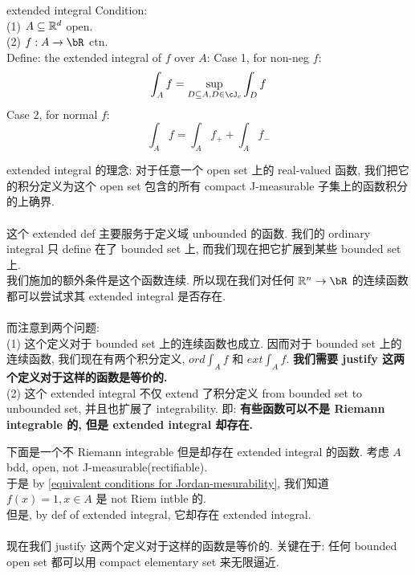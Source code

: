 \begin{definition}{extended integral}
    Condition:\\
    (1) $A \subseteq \mathbb{R}^d$ open.\\
    (2) $f:A\rar \bR $ ctn.\\
    Define: the extended integral of $f$ over $A$:
    Case 1, for non-neg $f$:
    $$
    \int_A f = \sup_{D \sub A, D\in \cJ_c} \int_D f
    $$
    Case 2, for normal $f$:
    $$
    \int_A f = \int_A f_+ + \int_A f_-
    $$
\end{definition}
\begin{remark}
    extended integral 的理念: 对于任意一个 open set 上的 real-valued 函数, 我们把它的积分定义为这个 open set 包含的所有 compact J-measurable 子集上的函数积分的上确界.\\\\
    这个 extended def 主要服务于定义域 unbounded 的函数. 我们的 ordinary integral 只 define 在了 bounded set 上, 而我们现在把它扩展到某些 bounded set 上.\\
    我们施加的额外条件是这个函数连续. 所以现在我们对任何 $\BR^n \rar \bR$ 的连续函数都可以尝试求其 extended integral 是否存在.\\\\
    而注意到两个问题:\\
    (1) 这个定义对于 bounded set 上的连续函数也成立. 因而对于 bounded set 上的连续函数, 我们现在有两个积分定义, $ord \int_A f$ 和 $ext \int_A f$. \textbf{我们需要 justify 这两个定义对于这样的函数是等价的.}\\
    (2) 这个 extended integral 不仅 extend 了积分定义 from bounded set to unbounded set, 并且也扩展了 integrability. 即: \textbf{有些函数可以不是 Riemann integrable 的, 但是 extended integral 却存在.}
\end{remark}

\begin{example}
    下面是一个不 Riemann integrable 但是却存在 extended integral 的函数.
    考虑 $A$ bdd, open, not J-measurable(rectifiable).\\
    于是 by \ref{equivalent conditions for Jordan-mesurability}, 我们知道 $f(x) = 1, x\in A$ 是 not Riem intble 的.\\
    但是, by def of extended integral, 它却存在 extended integral.
\end{example}

\paragraph*{}现在我们 justify 这两个定义对于这样的函数是等价的. 关键在于: 任何 bounded open set 都可以用 compact elementary set 来无限逼近.

